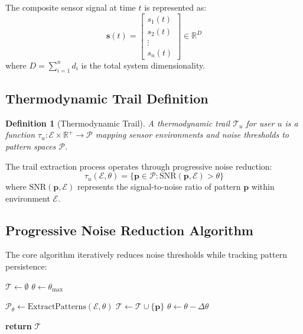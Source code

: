 \documentclass[12pt,a4paper]{article}
\newtheorem{definition}{Definition}
\begin{document}
The composite sensor signal at time $t$ is represented as:
$$\mathbf{s}(t) = \begin{bmatrix} s_1(t) \\ s_2(t) \\ \vdots \\ s_n(t) \end{bmatrix} \in \mathbb{R}^D$$
where $D = \sum_{i=1}^n d_i$ is the total system dimensionality.

\subsection{Thermodynamic Trail Definition}

\begin{definition}[Thermodynamic Trail]
A thermodynamic trail $\mathcal{T}_u$ for user $u$ is a function $\tau_u: \mathcal{E} \times \mathbb{R}^+ \rightarrow \mathcal{P}$ mapping sensor environments and noise thresholds to pattern spaces $\mathcal{P}$.
\end{definition}

The trail extraction process operates through progressive noise reduction:
$$\tau_u(\mathcal{E}, \theta) = \{\mathbf{p} \in \mathcal{P} : \text{SNR}(\mathbf{p}, \mathcal{E}) > \theta\}$$
where $\text{SNR}(\mathbf{p}, \mathcal{E})$ represents the signal-to-noise ratio of pattern $\mathbf{p}$ within environment $\mathcal{E}$.

\subsection{Progressive Noise Reduction Algorithm}

The core algorithm iteratively reduces noise thresholds while tracking pattern persistence:

\begin{algorithm}
\caption{Progressive Noise Reduction for Trail Extraction}
\begin{algorithmic}[1]
    \State $\mathcal{T} \leftarrow \emptyset$ 
    \State $\theta \leftarrow \theta_{\text{max}}$ 
    
        \State $\mathcal{P}_\theta \leftarrow \text{ExtractPatterns}(\mathcal{E}, \theta)$
                \State $\mathcal{T} \leftarrow \mathcal{T} \cup \{\mathbf{p}\}$
            \EndIf
        \EndFor
        \State $\theta \leftarrow \theta - \Delta\theta$
    \EndWhile
    
    \State \textbf{return} $\mathcal{T}$
\EndProcedure
\end{algorithmic}
\end{algorithm}
\end{document}
